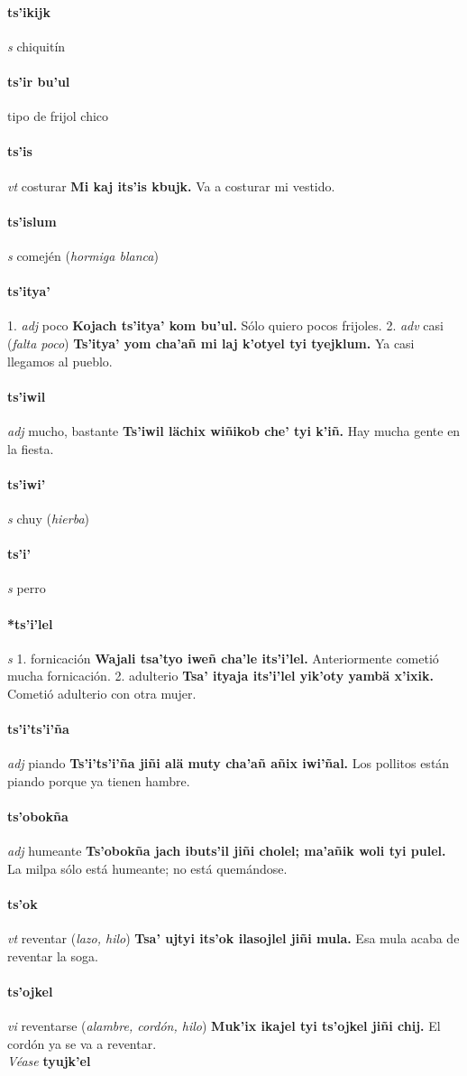 \documentclass{scrbook}
\newcommand{\entry}[1]{\paragraph{#1}}
\newcommand{\onedefinition}[1]{#1.}
\newcommand{\partofspeech}[1]{\textit{#1}}
\newcommand{\spanishtranslation}[1]{#1}
\newcommand{\clarification}[1]{(\textit{#1})}
\newcommand{\cholexample}[1]{\textbf{#1}}
\newcommand{\exampletranslation}[1]{#1}
\newcommand{\alsosee}[1]{\\\textit{Véase} \textbf{#1}}
\begin{document}
\begin{multicols}{2}
\entry{ts'ikijk}
\partofspeech{s}
\spanishtranslation{chiquitín}

\entry{ts'ir bu'ul}
\spanishtranslation{tipo de frijol chico}

\entry{ts'is}
\partofspeech{vt}
\spanishtranslation{costurar}
\cholexample{Mi kaj its'is kbujk.}
\exampletranslation{Va a costurar mi vestido.}

\entry{ts'islum}
\partofspeech{s}
\spanishtranslation{comején}
\clarification{hormiga blanca}

\entry{ts'itya'}
\onedefinition{1}
\partofspeech{adj}
\spanishtranslation{poco}
\cholexample{Kojach ts'itya' kom bu'ul.}
\exampletranslation{Sólo quiero pocos frijoles.}
\onedefinition{2}
\partofspeech{adv}
\spanishtranslation{casi}
\clarification{falta poco}
\cholexample{Ts'itya' yom cha'añ mi laj k'otyel tyi tyejklum.}
\exampletranslation{Ya casi llegamos al pueblo.}

\entry{ts'iwil}
\partofspeech{adj}
\spanishtranslation{mucho, bastante}
\cholexample{Ts'iwil lächix wiñikob che' tyi k'iñ.}
\exampletranslation{Hay mucha gente en la fiesta.}

\entry{ts'iwi'}
\partofspeech{s}
\spanishtranslation{chuy}
\clarification{hierba}

\entry{ts'i'}
\partofspeech{s}
\spanishtranslation{perro}

\entry{*ts'i'lel}
\partofspeech{s}
\onedefinition{1}
\spanishtranslation{fornicación}
\cholexample{Wajali tsa'tyo iweñ cha'le its'i'lel.}
\exampletranslation{Anteriormente cometió mucha fornicación.}
\onedefinition{2}
\spanishtranslation{adulterio}
\cholexample{Tsa' ityaja its'i'lel yik'oty yambä x'ixik.}
\exampletranslation{Cometió adulterio con otra mujer.}

\entry{ts'i'ts'i'ña}
\partofspeech{adj}
\spanishtranslation{piando}
\cholexample{Ts'i'ts'i'ña jiñi alä muty cha'añ añix iwi'ñal.}
\exampletranslation{Los pollitos están piando porque ya tienen hambre.}

\entry{ts'obokña}
\partofspeech{adj}
\spanishtranslation{humeante}
\cholexample{Ts'obokña jach ibuts'il jiñi cholel; ma'añik woli tyi pulel.}
\exampletranslation{La milpa sólo está humeante; no está quemándose.}

\entry{ts'ok}
\partofspeech{vt}
\spanishtranslation{reventar}
\clarification{lazo, hilo}
\cholexample{Tsa' ujtyi its'ok ilasojlel jiñi mula.}
\exampletranslation{Esa mula acaba de reventar la soga.}

\entry{ts'ojkel}
\partofspeech{vi}
\spanishtranslation{reventarse}
\clarification{alambre, cordón, hilo}
\cholexample{Muk'ix ikajel tyi ts'ojkel jiñi chij.}
\exampletranslation{El cordón ya se va a reventar.}
\alsosee{tyujk'el}


\end{multicols}
\end{document}
